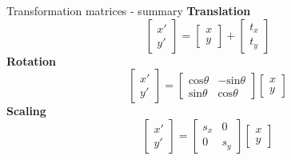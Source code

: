 \documentclass[9pt, aspectratio=169]{beamer}
\begin{document}
\begin{frame}
    {Transformation matrices - summary}
    \centering
    \textbf{Translation}
    $$\begin{bmatrix}x'\\y'\end{bmatrix} = \begin{bmatrix}x\\y\end{bmatrix} + \begin{bmatrix}t_x\\t_y\end{bmatrix}$$
    \textbf{Rotation}
    $$\begin{bmatrix}x'\\y'\end{bmatrix} = \begin{bmatrix}\text{cos}\theta&-\text{sin}\theta\\\text{sin}\theta&\text{cos}\theta\end{bmatrix}\begin{bmatrix}x\\y\end{bmatrix}$$
    \textbf{Scaling}
    $$\begin{bmatrix}x'\\y'\end{bmatrix} = \begin{bmatrix}s_x&0\\0&s_y\end{bmatrix}\begin{bmatrix}x\\y\end{bmatrix}$$
\end{frame}
\end{document}
